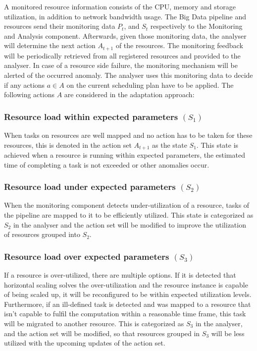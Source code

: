   A monitored resource information consists of the CPU, memory and storage utilization, in addition to network bandwidth usage.
  The Big Data pipeline and resources send their monitoring data $P_t$, and $S_t$ respectively to the Monitoring and Analysis component.
  Afterwards, given those monitoring data, the analyser will determine the next action $A_{t+1}$ of the resources.
  The monitoring feedback will be periodically retrieved from all registered resources and provided to the analyser.
  In case of a resource side failure, the monitoring mechanism will be alerted of the occurred anomaly.  
  The analyser uses this monitoring data to decide if any actions $a \in A$ on the current scheduling plan have to be applied.
  The following actions $A$ are considered in the adaptation approach:

  \subsubsection*{Resource load within expected parameters $(S_1)$} 

  When tasks on resources are well mapped and no action has to be taken for these resources, this is denoted in the action set $A_{t+1}$ as the state $S_1$. This state is achieved when a resource is running within expected parameters, the estimated time of completing a task is not exceeded or other anomalies occur.

  \subsubsection*{Resource load under expected parameters $(S_2)$}

  When the monitoring component detects under-utilization of a resource, tasks of the pipeline are mapped to it to be efficiently utilized. This state is categorized as $S_2$ in the analyser and the action set will be modified to improve the utilization of resources grouped into $S_2$. 

  \subsubsection*{Resource load over expected parameters $(S_3)$} 

  If a resource is over-utilized, there are multiple options. If it is detected that horizontal scaling solves the over-utilization and the resource instance is capable of being scaled up, it will be reconfigured to be within expected utilization levels. Furthermore, if an ill-defined task is detected and was mapped to a resource that isn't capable to fulfil the computation within a reasonable time frame, this task will be migrated to another resource. 
  This is categorized as $S_3$ in the analyser, and the action set will be modified, so that resources grouped in $S_3$ will be less utilized with the upcoming updates of the action set. \cite{kimovskiBigDataPipeline2022}




